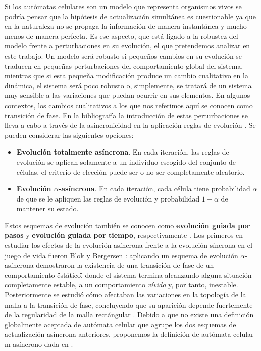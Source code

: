\documentclass[../proyecto.tex]{book}
\begin{document}
Si los autómatas celulares son un modelo que representa organismos vivos se podría pensar que la hipótesis de actualización simultánea es cuestionable ya que en la naturaleza no se propaga la información de manera instantánea y mucho menos de manera perfecta. Es ese aspecto, que está ligado a la robustez del modelo frente a perturbaciones en su evolución, el que pretendemos analizar en este trabajo. Un modelo será robusto si pequeños cambios en su evolución se traducen en pequeñas perturbaciones del comportamiento global del sistema, mientras que si esta pequeña modificación produce un cambio cualitativo en la dinámica, el sistema será poco robusto o, simplemente, se tratará de un sistema muy sensible a las variaciones que puedan ocurrir en sus elementos. En algunos contextos, los cambios cualitativos a los que nos referimos aquí se conocen como transición de fase. En la bibliografía la introducción de estas perturbaciones se lleva a cabo a través de la asincronicidad en la aplicación reglas de evolución \cite{asyncIntro}. Se pueden considerar las siguientes opciones:
\begin{itemize}
	\item \textbf{Evolución totalmente asíncrona}. En cada iteración, las reglas de evolución se aplican solamente a un individuo escogido del conjunto de células, el criterio de elección puede ser o no ser completamente aleatorio.
	\item \textbf{Evolución $\alpha$-asíncrona}. En cada iteración, cada célula tiene probabilidad $\alpha$ de que se le apliquen las reglas de evolución y probabilidad $1-\alpha$ de mantener su estado.
\end{itemize}

Estos esquemas de evolución también se conocen como \textbf{evolución guiada por pasos} y \textbf{evolución guiada por tiempo}, respectivamente \cite{aka}. Los primeros en estudiar los efectos de la evolución asíncrona frente a la evolución síncrona en el juego de vida fueron Blok y Bergersen \cite{syncVSasync}: aplicando un esquema de evolución $\alpha$-asíncrona demostraron la existencia de una transición de fase de un comportamiento \"estático\", donde el sistema termina alcanzando alguna situación completamente estable, a un comportamiento \textit{vívido} y, por tanto, inestable. Posteriormente se estudió cómo afectaban las variaciones en la topología de la malla a la transición de fase, concluyendo que su aparición depende fuertemente de la regularidad de la malla rectángular \cite{mallaIrregular}. Debido a que no existe una definición globalmente aceptada de autómata celular que agrupe los dos esquemas de actualización asíncrona anteriores, proponemos la definición de autómata celular m-asíncrono dada en \cite{oraculo}. 
\end{document}
